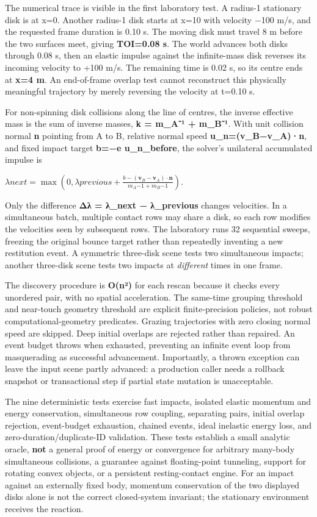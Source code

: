 The numerical trace is visible in the first laboratory test. A radius-1 stationary disk is at x=0. Another radius-1 disk starts at x=10 with velocity −100 m/s, and the requested frame duration is 0.10 s. The moving disk must travel 8 m before the two surfaces meet, giving \textbf{TOI=0.08 s}. The world advances both disks through 0.08 s, then an elastic impulse against the infinite-mass disk reverses its incoming velocity to +100 m/s. The remaining time is 0.02 s, so its centre ends at \textbf{x=4 m}. An end-of-frame overlap test cannot reconstruct this physically meaningful trajectory by merely reversing the velocity at t=0.10 s.

For non-spinning disk collisions along the line of centres, the inverse effective mass is the sum of inverse masses, \textbf{k = m\_A⁻¹ + m\_B⁻¹}. With unit collision normal \textbf{n} pointing from A to B, relative normal speed \textbf{u\_n=(v\_B−v\_A)·n}, and fixed impact target \textbf{b=−e u\_n\_before}, the solver's unilateral accumulated impulse is

\(\lambda{next}=\max\left(0,\lambda{previous} +\frac{b-(\mathbf v_B-\mathbf v_A)\cdot\mathbf n} {m_A{-1}+m_B{-1}}\right).\)

Only the difference \textbf{Δλ = λ\_next − λ\_previous} changes velocities. In a simultaneous batch, multiple contact rows may share a disk, so each row modifies the velocities seen by subsequent rows. The laboratory runs 32 sequential sweeps, freezing the original bounce target rather than repeatedly inventing a new restitution event. A symmetric three-disk scene tests two simultaneous impacts; another three-disk scene tests two impacts at \emph{different} times in one frame.

The discovery procedure is \textbf{O(n²)} for each rescan because it checks every unordered pair, with no spatial acceleration. The same-time grouping threshold and near-touch geometry threshold are explicit finite-precision policies, not robust computational-geometry predicates. Grazing trajectories with zero closing normal speed are skipped. Deep initial overlaps are rejected rather than repaired. An event budget throws when exhausted, preventing an infinite event loop from masquerading as successful advancement. Importantly, a thrown exception can leave the input scene partly advanced: a production caller needs a rollback snapshot or transactional step if partial state mutation is unacceptable.

The nine deterministic tests exercise fast impacts, isolated elastic momentum and energy conservation, simultaneous row coupling, separating pairs, initial overlap rejection, event-budget exhaustion, chained events, ideal inelastic energy loss, and zero-duration/duplicate-ID validation. These tests establish a small analytic oracle, \textbf{not} a general proof of energy or convergence for arbitrary many-body simultaneous collisions, a guarantee against floating-point tunneling, support for rotating convex objects, or a persistent resting-contact engine. For an impact against an externally fixed body, momentum conservation of the two displayed disks alone is not the correct closed-system invariant; the stationary environment receives the reaction.

